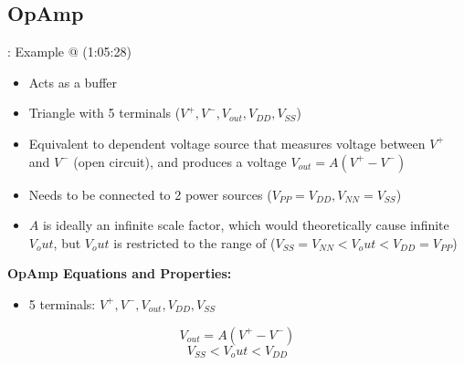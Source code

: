\documentclass{article}\usepackage{amsmath,amssymb,amsthm,tikz,tkz-graph,color,chngpage,soul,hyperref,csquotes,graphicx,floatrow}\newcommand*{\QEDB}{\hfill\ensuremath{\square}}\newtheorem*{prop}{Proposition}\renewcommand{\theenumi}{\alph{enumi}}\usepackage[shortlabels]{enumitem}\usepackage[nobreak=true]{mdframed}\usetikzlibrary{matrix,calc}\MakeOuterQuote{"}\usepackage[margin=0.75in]{geometry} \newtheorem{theorem}{Theorem}
\begin{document}
\subsection*{OpAmp}: Example @ (1:05:28)
\begin{itemize}
    \item Acts as a buffer
    \item Triangle with 5 terminals ($V^+, V^-, V_{out}, V_{DD}, V_{SS}$)
    \item Equivalent to dependent voltage source that measures voltage between $V^+$ and $V^-$ (open circuit), and produces a voltage $V_{out}=A(V^{+}-V^{-})$
    \item Needs to be connected to 2 power sources ($V_{PP}=V_{DD}, V_{NN}=V_{SS}$)
    \item $A$ is ideally an infinite scale factor, which would theoretically cause infinite $V_out$, but $V_out$ is restricted to the range of ($V_{SS} = V_{NN} < V_out < V_{DD} = V_{PP}$)
\end{itemize}
\begin{mdframed}
\textbf{OpAmp Equations and Properties:}
\begin{itemize}
    \item 5 terminals: $V^+, V^-, V_{out}, V_{DD}, V_{SS}$
\end{itemize}
\begin{equation}V_{out}=A(V^{+}-V^{-})\end{equation}
\begin{equation}V_{SS} < V_out < V_{DD}\end{equation}
\end{mdframed}
\end{document}
